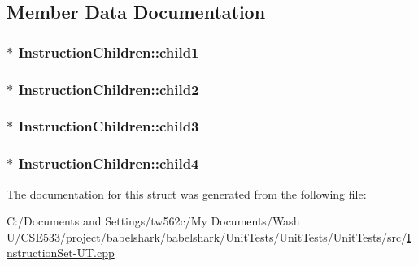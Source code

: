 \subsection{Member Data Documentation}
\hypertarget{struct_instruction_children_987efbbfa2096fb79332d0adeeb75d11}{
\subsubsection[{child1}]{$\ast$ {\bf InstructionChildren::child1}}}
\label{struct_instruction_children_987efbbfa2096fb79332d0adeeb75d11}


\hypertarget{struct_instruction_children_5270f351c7a3f3aaeab9fd1b2f9b0415}{
\subsubsection[{child2}]{$\ast$ {\bf InstructionChildren::child2}}}
\label{struct_instruction_children_5270f351c7a3f3aaeab9fd1b2f9b0415}


\hypertarget{struct_instruction_children_372efbfdfb467ea126e947e39620b49b}{
\subsubsection[{child3}]{$\ast$ {\bf InstructionChildren::child3}}}
\label{struct_instruction_children_372efbfdfb467ea126e947e39620b49b}


\hypertarget{struct_instruction_children_594e48b823408bfc820d922cc5d18b0d}{
\subsubsection[{child4}]{$\ast$ {\bf InstructionChildren::child4}}}
\label{struct_instruction_children_594e48b823408bfc820d922cc5d18b0d}




The documentation for this struct was generated from the following file:\begin{CompactItemize}
\item 
C:/Documents and Settings/tw562c/My Documents/Wash U/CSE533/project/babelshark/babelshark/UnitTests/UnitTests/UnitTests/src/\hyperlink{_instruction_set-_u_t_8cpp}{InstructionSet-UT.cpp}\end{CompactItemize}
